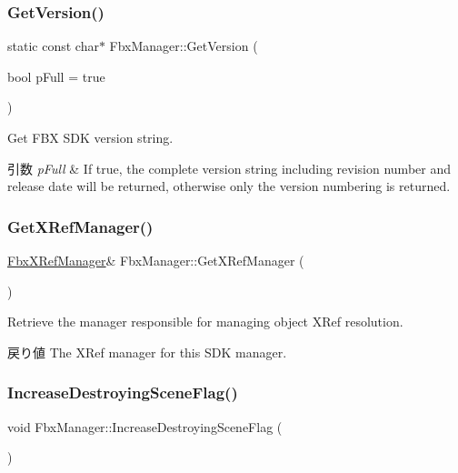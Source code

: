\subsubsection{\texorpdfstring{Get\+Version()}{GetVersion()}}
{\footnotesize\ttfamily static const char$\ast$ Fbx\+Manager\+::\+Get\+Version (\begin{DoxyParamCaption}\item[{bool}]{p\+Full = {\ttfamily true} }\end{DoxyParamCaption})\hspace{0.3cm}{\ttfamily [static]}}

Get F\+BX S\+DK version string. 
\begin{DoxyParams}{引数}
{\em p\+Full} & If true, the complete version string including revision number and release date will be returned, otherwise only the version numbering is returned. \\
\hline
\end{DoxyParams}
\mbox{\label{class_fbx_manager_a36bfe163f5c00634de9e102600a71f8d}} 
\subsubsection{\texorpdfstring{Get\+X\+Ref\+Manager()}{GetXRefManager()}}
{\footnotesize\ttfamily \hyperlink{class_fbx_x_ref_manager}{Fbx\+X\+Ref\+Manager}\& Fbx\+Manager\+::\+Get\+X\+Ref\+Manager (\begin{DoxyParamCaption}{ }\end{DoxyParamCaption})}

Retrieve the manager responsible for managing object X\+Ref resolution. \begin{DoxyReturn}{戻り値}
The X\+Ref manager for this S\+DK manager. 
\end{DoxyReturn}
\mbox{\label{class_fbx_manager_ad0c6b924a178ca43748a4e2ee3d6462a}} 
\subsubsection{\texorpdfstring{Increase\+Destroying\+Scene\+Flag()}{IncreaseDestroyingSceneFlag()}}
{\footnotesize\ttfamily void Fbx\+Manager\+::\+Increase\+Destroying\+Scene\+Flag (\begin{DoxyParamCaption}{ }\end{DoxyParamCaption})}

